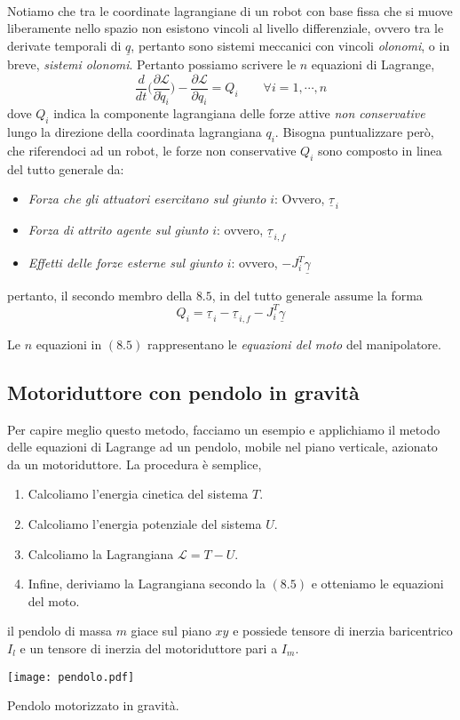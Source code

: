 \paragraph{}
Notiamo che tra le coordinate lagrangiane di un robot con base fissa che si muove liberamente nello spazio non esistono vincoli al livello differenziale, ovvero tra le derivate temporali di $\underline{q}$, pertanto sono sistemi meccanici con vincoli \emph{olonomi}, o in breve, \emph{sistemi olonomi}. Pertanto possiamo scrivere le $n$ equazioni di Lagrange,
\begin{equation}
	\frac{d}{dt} \Biggl( \frac{\partial \mathcal{L}}{\partial \dot{q}_i} \Biggr) - \frac{\partial \mathcal{L}}{\partial q_i} = Q_i \qquad \forall i = 1, \cdots, n
\end{equation}
dove $Q_i$ indica la componente lagrangiana delle forze attive \emph{non conservative} lungo la direzione della coordinata lagrangiana $q_i$. Bisogna puntualizzare però, che riferendoci ad un robot, le forze non conservative $Q_i$ sono composto in linea del tutto generale da:
\begin{itemize}
	\item \emph{Forza che gli attuatori esercitano sul giunto} $i$: Ovvero, $\underline{\tau}_{\,i}$
	\item \emph{Forza di attrito agente sul giunto} $i$: ovvero, $\underline{\tau}_{\,i,f}$
	\item \emph{Effetti delle forze esterne sul giunto} $i$: ovvero, $-J_i^T \underline{\gamma}$
\end{itemize}
pertanto, il secondo membro della $8.5$, in del tutto generale assume la forma 
\begin{equation*}
	Q_i = \underline{\tau}_{\,i}-\underline{\tau}_{\,i,f} - J_i^T \underline{\gamma}
\end{equation*}

Le $n$ equazioni in $(8.5)$ rappresentano le \emph{equazioni del moto} del manipolatore.

\subsection{Motoriduttore con pendolo in gravità}
Per capire meglio questo metodo, facciamo un esempio e applichiamo il metodo delle equazioni di Lagrange ad un pendolo, mobile nel piano verticale, azionato da un motoriduttore. La procedura è semplice,
\begin{enumerate}
	\item Calcoliamo l'energia cinetica del sistema $T$.
	\item Calcoliamo l'energia potenziale del sistema $U$.
	\item Calcoliamo la Lagrangiana $\mathcal{L} = T-U$.
	\item Infine, deriviamo la Lagrangiana secondo la $(8.5)$ e otteniamo le equazioni del moto.
\end{enumerate} 
il pendolo di massa $m$ giace sul piano $xy$ e possiede tensore di inerzia baricentrico $I_l$ e un tensore di inerzia del motoriduttore pari a $I_m$. 
\begin{center}
	\texttt{[image: pendolo.pdf]}
	\caption{Pendolo motorizzato in gravità.}
\end{center}

